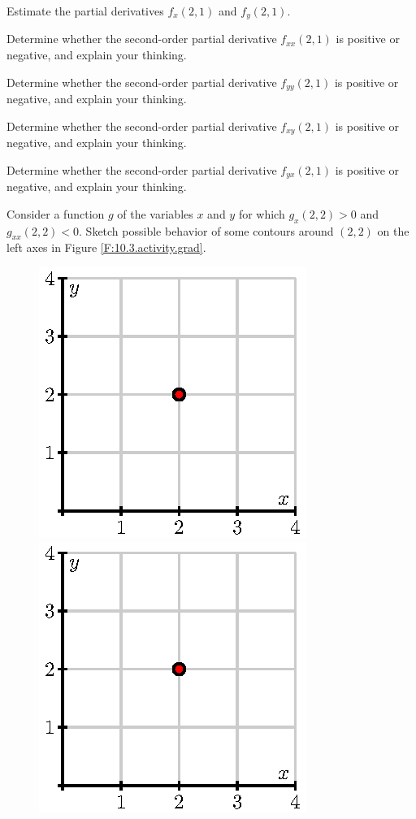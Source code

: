 \begin{exercises}
\ba
\item Estimate the partial derivatives $f_x(2,1)$ and $f_y(2,1)$.
\item Determine whether the second-order partial derivative
  $f_{xx}(2,1)$ is positive or negative, and explain your thinking. 
\item Determine whether the second-order partial derivative
  $f_{yy}(2,1)$ is positive or negative, and explain your thinking.
\item Determine whether the second-order partial derivative
  $f_{xy}(2,1)$ is positive or negative, and explain your thinking.
\item Determine whether the second-order partial derivative
  $f_{yx}(2,1)$ is positive or negative, and explain your thinking.
\item Consider a function $g$ of the variables $x$ and $y$ for which $g_x(2,2) > 0$ and
  $g_{xx}(2,2) < 0$.  Sketch possible behavior of some contours around $(2,2)$ on the left axes in Figure \ref{F:10.3.activity.grad}.
  \begin{figure}[ht]
    \begin{center}
      \includegraphics{figures/fig_10_2_activity_grad.eps}
      \hspace*{1in}
      \includegraphics{figures/fig_10_2_activity_grad.eps}

\end{center}
\end{figure}
\end{exercises}
